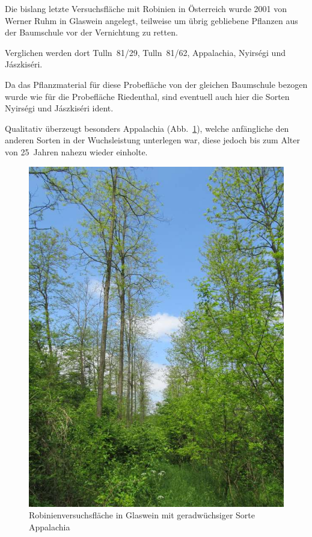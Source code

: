 \documentclass[twocolumn]{scrartcl}
\begin{document}
Die bislang letzte Versuchsfläche mit Robinien in Österreich wurde
2001 von Werner Ruhm in Glaswein angelegt, teilweise um übrig
gebliebene Pflanzen aus der Baumschule vor der Vernichtung zu retten.

Verglichen werden dort Tulln~81/29, Tulln~81/62, Appalachia, Nyirségi
und Jászkiséri.

Da das Pflanzmaterial für diese Probefläche von der gleichen
Baumschule bezogen wurde wie für die Probefläche Riedenthal, sind
eventuell auch hier die Sorten Nyirségi und Jászkiséri ident.

Qualitativ überzeugt besonders Appalachia (Abb.~\ref{fig:glaswein2}),
welche anfängliche den anderen Sorten in der Wuchsleistung unterlegen
war, diese jedoch bis zum Alter von 25~Jahren nahezu wieder einholte.

\begin{figure}[htbp]
  \centering
  \includegraphics[width=.9\linewidth]{./bild/GlasweinRobinie2023b}
  \caption{Robinienversuchsfläche in Glaswein mit geradwüchsiger Sorte Appalachia}
  \label{fig:glaswein2}
\end{figure}
\end{document}
